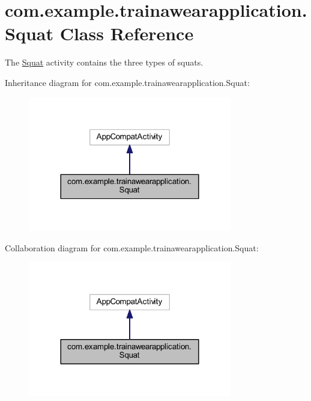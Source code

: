 \hypertarget{classcom_1_1example_1_1trainawearapplication_1_1_squat}{}\section{com.\+example.\+trainawearapplication.\+Squat Class Reference}
\label{classcom_1_1example_1_1trainawearapplication_1_1_squat}


The \mbox{\hyperlink{classcom_1_1example_1_1trainawearapplication_1_1_squat}{Squat}} activity contains the three types of squats.  




Inheritance diagram for com.\+example.\+trainawearapplication.\+Squat\+:
\nopagebreak
\begin{figure}[H]
\begin{center}
\leavevmode
\includegraphics[width=252pt]{classcom_1_1example_1_1trainawearapplication_1_1_squat__inherit__graph}
\end{center}
\end{figure}


Collaboration diagram for com.\+example.\+trainawearapplication.\+Squat\+:
\nopagebreak
\begin{figure}[H]
\begin{center}
\leavevmode
\includegraphics[width=252pt]{classcom_1_1example_1_1trainawearapplication_1_1_squat__coll__graph}
\end{center}
\end{figure}
